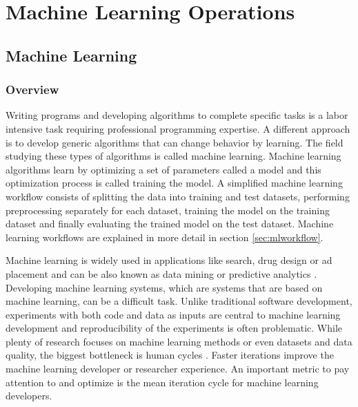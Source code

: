 \chapter{Machine Learning Operations}


\section{Machine Learning} %
\label{sec:ml}

\subsection{Overview}

Writing programs and developing algorithms to complete specific tasks is a labor intensive task requiring professional programming expertise.
A different approach is to develop generic algorithms that can change behavior by learning. %
The field studying these types of algorithms is called machine learning. %
Machine learning algorithms learn by optimizing a set of parameters called a model and this optimization process is called training the model. %
A simplified machine learning workflow consists of splitting the data into training and test datasets, performing preprocessing separately for each dataset, training the model on the training dataset and finally evaluating the trained model on the test dataset.  %
Machine learning workflows are explained in more detail in section \ref{sec:mlworkflow}.

Machine learning is widely used in applications like search, drug design or ad placement and can be also known as data mining or predictive analytics \parencite{domingosFewUsefulThings2012}. Developing machine learning systems, which are systems that are based on machine learning, can be a difficult task. Unlike traditional software development, experiments with both code and data as inputs are central to machine learning development \parencite{zahariaAcceleratingMachineLearning2018} and reproducibility of the experiments is often problematic. While plenty of research focuses on machine learning methods or even datasets and data quality, the biggest bottleneck is human cycles \parencite{domingosFewUsefulThings2012}. Faster iterations improve the machine learning developer or researcher experience. An important metric to pay attention to and optimize is the mean iteration cycle for machine learning developers.

